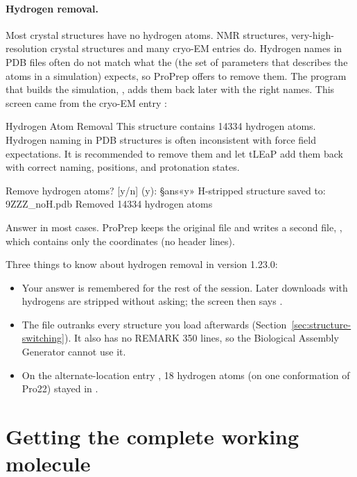 \paragraph{Hydrogen removal.} Most crystal structures have no hydrogen atoms.
NMR structures, very-high-resolution crystal structures and many cryo-EM
entries do. Hydrogen names in PDB files often do not match what the
 (the set of parameters that describes the atoms in a
simulation) expects, so ProPrep offers to remove them. The program that builds
the simulation, , adds them back later with the right names. This
screen came from the cryo-EM entry :
\begin{screen}
Hydrogen Atom Removal
This structure contains 14334 hydrogen atoms. Hydrogen naming in PDB structures
is often inconsistent with force field expectations. It is recommended to remove
them and let tLEaP add them back with correct naming, positions, and protonation
states.

Remove hydrogen atoms? [y/n] (y): §ans«y»
H-stripped structure saved to: 9ZZZ_noH.pdb
Removed 14334 hydrogen atoms
\end{screen}
Answer  in most cases. ProPrep keeps the original file and writes a
second file, , which contains only the coordinates (no
header lines).

\begin{watchout}
Three things to know about hydrogen removal in version 1.23.0:
\begin{itemize}
  \item Your answer is remembered for the rest of the session. Later downloads
        with hydrogens are stripped without asking; the screen then says
        .
  \item The  file outranks every structure you load afterwards
        (Section~\ref{sec:structure-switching}). It also has no REMARK 350 lines,
        so the Biological Assembly Generator cannot use it.
  \item On the alternate-location entry , 18 hydrogen atoms (on one
        conformation of Pro22) stayed in .
\end{itemize}
\end{watchout}

\section{Getting the complete working molecule}
\label{sec:structure-assembly}

